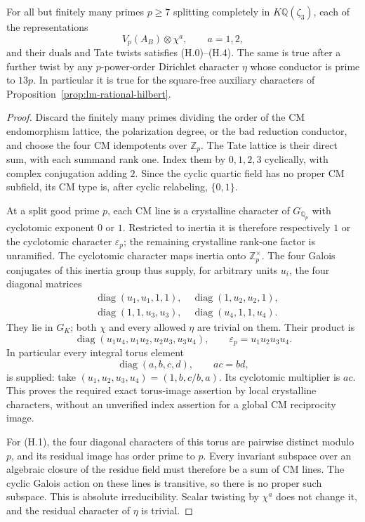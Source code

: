 \begin{lemma}
\label{lem:lm-thirteen-mr}
For all but finitely many primes $p\geq7$ splitting completely in
$K\mathbb Q(\zeta_3)$, each of the representations
\[
 V_p(A_B)\otimes\chi^a,\qquad a=1,2,
\]
and their duals and Tate twists satisfies (H.0)--(H.4).  The same is
true after a further twist by any $p$-power-order Dirichlet character
$\eta$ whose conductor is prime to $13p$.  In particular it is true
for the square-free auxiliary characters of
Proposition~\ref{prop:lm-rational-hilbert}.
\end{lemma}
\begin{proof}
Discard the finitely many primes dividing the order of the CM
endomorphism lattice, the polarization degree, or the bad reduction
conductor, and choose the four CM idempotents over $\mathbb Z_p$.
The Tate lattice is their direct sum, with each summand rank one.
Index them by $0,1,2,3$ cyclically, with complex conjugation adding
$2$.  Since the cyclic quartic field has no proper CM subfield, its
CM type is, after cyclic relabeling, $\{0,1\}$.

At a split good prime $p$, each CM line is a crystalline character
of $G_{\mathbb Q_p}$ with cyclotomic exponent $0$ or $1$. Restricted
to inertia it is therefore respectively $1$ or the cyclotomic
character $\varepsilon_p$; the remaining crystalline rank-one
factor is unramified.  The cyclotomic character maps inertia onto
$\mathbb Z_p^\times$.  The four Galois conjugates of this inertia
group thus supply, for arbitrary units $u_i$, the four diagonal
matrices
\[
 \begin{split}
 &\operatorname{diag}(u_1,u_1,1,1),\quad
 \operatorname{diag}(1,u_2,u_2,1),\\
 &\operatorname{diag}(1,1,u_3,u_3),\quad
 \operatorname{diag}(u_4,1,1,u_4).
 \end{split}
\]
They lie in $G_K$; both $\chi$ and every allowed $\eta$ are trivial
on them.  Their product is
\[
 \operatorname{diag}(u_1u_4,u_1u_2,u_2u_3,u_3u_4),
 \qquad \varepsilon_p= u_1u_2u_3u_4.
\]
In particular every integral torus element
\[
 \operatorname{diag}(a,b,c,d),\qquad ac=bd,
\]
is supplied: take $(u_1,u_2,u_3,u_4)=(1,b,c/b,a)$.
Its cyclotomic multiplier is $ac$.  This proves the required exact
torus-image assertion by local crystalline characters, without an
unverified index assertion for a global CM reciprocity image.

For (H.1), the four diagonal characters of this torus are pairwise
distinct modulo $p$, and its residual image has order prime to $p$.
Every invariant subspace over an algebraic closure of the residue
field must therefore be a sum of CM lines.  The cyclic Galois action
on these lines is transitive, so there is no proper such subspace.
This is absolute irreducibility.  Scalar twisting by $\chi^a$ does
not change it, and the residual character of $\eta$ is trivial.


\end{proof}
